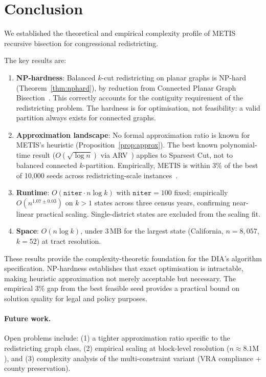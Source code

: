 \section{Conclusion}
\label{sec:conclusion}

We established the theoretical and empirical complexity profile of METIS
recursive bisection for congressional redistricting.

The key results are:

\begin{enumerate}
  \item \textbf{NP-hardness}: Balanced $k$-cut redistricting on planar
    graphs is NP-hard (Theorem~\ref{thm:nphard}), by reduction from
    Connected Planar Graph Bisection~\citep{dyer1985partitioning}.
    This correctly accounts for the contiguity requirement of the
    redistricting problem.  The hardness is for optimisation, not
    feasibility: a valid partition always exists for connected graphs.
  \item \textbf{Approximation landscape}: No formal approximation ratio
    is known for METIS's heuristic (Proposition~\ref{prop:approx}).
    The best known polynomial-time result ($O(\sqrt{\log n})$ via
    ARV~\citep{arora2009expander}) applies to Sparsest Cut, not to
    balanced connected $k$-partition.
    Empirically, METIS is within 3\% of the best of 10,000 seeds
    across redistricting-scale instances~\citep{b7paper}.
  \item \textbf{Runtime}: $O(\texttt{niter} \cdot n \log k)$ with
    $\texttt{niter} = 100$ fixed; empirically $O(n^{1.07 \pm 0.03})$
    on $k > 1$ states across three census years, confirming near-linear
    practical scaling.
    Single-district states are excluded from the scaling fit.
  \item \textbf{Space}: $O(n \log k)$, under 3\,MB for the largest
    state (California, $n = 8{,}057$, $k = 52$) at tract resolution.
\end{enumerate}

These results provide the complexity-theoretic foundation for the DIA's
algorithm specification.  NP-hardness establishes that exact optimisation
is intractable, making heuristic approximation not merely acceptable but
necessary.  The empirical 3\% gap from the best feasible seed provides
a practical bound on solution quality for legal and policy purposes.

\paragraph{Future work.}
Open problems include: (1) a tighter approximation ratio specific to the
redistricting graph class, (2) empirical scaling at block-level resolution
($n \approx 8.1\mathrm{M}$), and (3) complexity analysis of the
multi-constraint variant (VRA compliance + county preservation).
